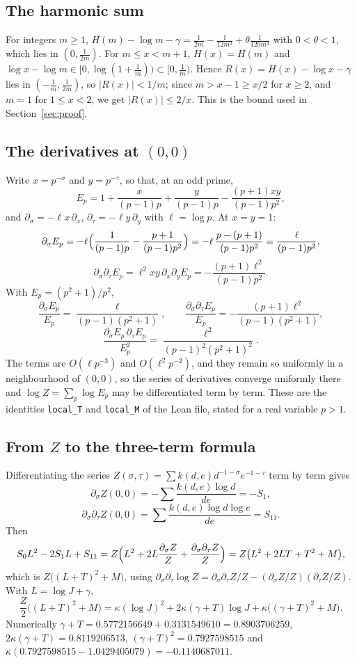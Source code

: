 \documentclass{amsart}
\theoremstyle{definition}
\theoremstyle{remark}
\numberwithin{equation}{section}
\begin{document}
\subsection{The harmonic sum}\label{app:harmonic}
For integers $m\ge1$, $H(m)-\log m-\gamma=\frac1{2m}-\frac1{12m^2}+\theta\frac1{120m^4}$ with $0<\theta<1$, which lies in $(0,\frac1{2m})$. For $m\le x<m+1$, $H(x)=H(m)$ and $\log x-\log m\in[0,\log(1+\frac1m))\subset[0,\frac1m)$. Hence $R(x)=H(x)-\log x-\gamma$ lies in $(-\frac1m,\frac1{2m})$, so $|R(x)|<1/m$; since $m>x-1\ge x/2$ for $x\ge2$, and $m=1$ for $1\le x<2$, we get $|R(x)|\le 2/x$. This is the bound used in Section~\ref{sec:proof}.

\subsection{The derivatives at \texorpdfstring{$(0,0)$}{(0,0)}}\label{app:derivatives}
Write $x=p^{-\sigma}$ and $y=p^{-\tau}$, so that, at an odd prime,
\[
E_p=1+\frac{x}{(p-1)p}+\frac{y}{(p-1)p}-\frac{(p+1)xy}{(p-1)p^2},
\]
and $\partial_\sigma=-\ell x\,\partial_x$, $\partial_\tau=-\ell y\,\partial_y$ with $\ell=\log p$. At $x=y=1$:
\[
\partial_\sigma E_p=-\ell\Bigl(\frac1{(p-1)p}-\frac{p+1}{(p-1)p^2}\Bigr)=-\ell\,\frac{p-(p+1)}{(p-1)p^2}=\frac{\ell}{(p-1)p^2},
\]
\[
\partial_\sigma\partial_\tau E_p=\ell^2xy\,\partial_x\partial_yE_p=-\frac{(p+1)\ell^2}{(p-1)p^2}.
\]
With $E_p=(p^2+1)/p^2$,
\[
\frac{\partial_\sigma E_p}{E_p}=\frac{\ell}{(p-1)(p^2+1)},\qquad \frac{\partial_\sigma\partial_\tau E_p}{E_p}=-\frac{(p+1)\ell^2}{(p-1)(p^2+1)},
\]
\[
\frac{\partial_\sigma E_p\,\partial_\tau E_p}{E_p^2}=\frac{\ell^2}{(p-1)^2(p^2+1)^2}.
\]
The terms are $O(\ell p^{-3})$ and $O(\ell^2p^{-2})$, and they remain so uniformly in a neighbourhood of $(0,0)$, so the series of derivatives converge uniformly there and $\log Z=\sum_p\log E_p$ may be differentiated term by term. These are the identities \texttt{local\_T} and \texttt{local\_M} of the Lean file, stated for a real variable $p>1$.

\subsection{From \texorpdfstring{$Z$}{Z} to the three-term formula}\label{app:expansion}
Differentiating the series $Z(\sigma,\tau)=\sum k(d,e)d^{-1-\sigma}e^{-1-\tau}$ term by term gives
\[
\partial_\sigma Z(0,0)=-\sum\frac{k(d,e)\log d}{de}=-S_1,
\]
\[
\partial_\sigma\partial_\tau Z(0,0)=\sum\frac{k(d,e)\log d\log e}{de}=S_{11}.
\]
Then
\[
S_0L^2-2S_1L+S_{11}=Z\Bigl(L^2+2L\frac{\partial_\sigma Z}{Z}+\frac{\partial_\sigma\partial_\tau Z}{Z}\Bigr)=Z\bigl(L^2+2LT+T^2+M\bigr),
\]
which is $Z\bigl((L+T)^2+M\bigr)$, using $\partial_\sigma\partial_\tau\log Z=\partial_\sigma\partial_\tau Z/Z-(\partial_\sigma Z/Z)(\partial_\tau Z/Z)$. With $L=\log J+\gamma$,
\[
\frac Z2\bigl((L+T)^2+M\bigr)=\kappa(\log J)^2+2\kappa(\gamma+T)\log J+\kappa\bigl((\gamma+T)^2+M\bigr).
\]
Numerically $\gamma+T=0.5772156649+0.3131549610=0.8903706259$, $2\kappa(\gamma+T)=0.8119206513$, $(\gamma+T)^2=0.7927598515$ and $\kappa(0.7927598515-1.0429405079)=-0.1140687011$.
\end{document}
